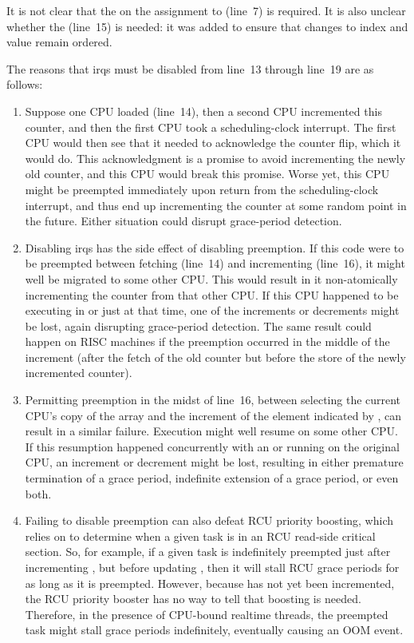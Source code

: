 It is not clear that the  on the assignment to
 (line~7) is required.
It is also unclear whether the 
(line~15) is needed: it was added to ensure that changes to index
and value remain ordered.

The reasons that irqs must be disabled from line~13 through
line~19 are as follows:

\begin{enumerate}
\item	Suppose one CPU loaded 
	(line~14), then a second CPU incremented this counter,
	and then the first CPU took a scheduling-clock interrupt.
	The first CPU would then see that it needed to acknowledge
	the counter flip, which it would do.
	This acknowledgment is a promise to avoid incrementing
	the newly old counter, and this CPU would break this
	promise.
	Worse yet, this CPU might be preempted immediately upon
	return from the scheduling-clock interrupt, and thus
	end up incrementing the counter at some random point
	in the future.
	Either situation could disrupt grace-period detection.
\item	Disabling irqs has the side effect of disabling preemption.
	If this code were to be preempted between fetching
	 (line~14) and
	incrementing  (line~16),
	it might well be migrated to some other CPU.
	This would result in it non-atomically incrementing
	the counter from that other CPU.
	If this CPU happened to be executing in 
	or  just at that time, one
	of the increments or decrements might be lost, again
	disrupting grace-period detection.
	The same result could happen on RISC machines if the preemption
	occurred in the middle of the increment (after the fetch of
	the old counter but before the store of the newly incremented
	counter).
\item	Permitting preemption in the midst
	of line~16, between selecting the current CPU's copy
	of the  array and the increment of
	the element indicated by , can
	result in a similar failure.
	Execution might well resume on some other CPU.
	If this resumption happened concurrently with an
	 or 
	running on the original CPU,
	an increment or decrement might be lost, resulting in either
	premature termination of a grace period, indefinite extension
	of a grace period, or even both.
\item	Failing to disable preemption can also defeat RCU priority
	boosting, which relies on 
	to determine when a given task is in an RCU read-side
	critical section.
	So, for example, if a given task is indefinitely
	preempted just after incrementing ,
	but before updating ,
	then it will stall RCU grace periods for as long as it
	is preempted.
	However, because  has not
	yet been incremented, the RCU priority booster has no way
	to tell that boosting is needed.
	Therefore, in the presence of CPU-bound realtime threads,
	the preempted task might stall grace periods indefinitely,
	eventually causing an OOM event.
\end{enumerate}

